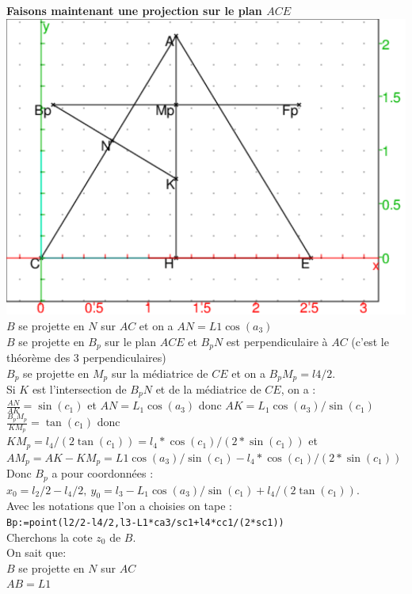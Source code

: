 \documentclass[a4paper,11pt]{book}
\begin{document}
{\bf Faisons maintenant une projection sur le plan  $ACE$}\\
\includegraphics[width=\textwidth]{glucoplan}\\
$B$ se projette en $N$ sur $AC$ et on a $AN=L1\cos(a_3)$\\
$B$ se projette en $B_p$ sur le plan $ACE$ et $B_pN$ est perpendiculaire 
\`a $AC$ (c'est le th\'eor\`eme des 3 perpendiculaires)\\
$B_p$ se projette en $M_p$ sur la m\'ediatrice de $CE$ et on a $B_pM_p=l4/2$.\\
Si $K$ est l'intersection de $B_pN$ et de la m\'ediatrice de $CE$, on a :\\
$\displaystyle \frac{AN}{AK}=\sin(c_1)$ et $AN=L_1\cos(a_3)$ donc
 $AK=L_1\cos(a_3)/\sin(c_1)$\\
$\displaystyle \frac{B_pM_p}{KM_p}=\tan(c_1)$ donc $KM_p=l_4/(2\tan(c_1))=l_4*\cos(c_1)/(2*\sin(c_1))$ et\\
 $AM_p=AK-KM_p=L1\cos(a_3)/\sin(c_1)-l_4*\cos(c_1)/(2*\sin(c_1))$\\
Donc $B_p$ a pour coordonn\'ees :\\
 $x_0=l_2/2-l_4/2,\ y_0= l_3-L_1\cos(a_3)/\sin(c_1)+l_4/(2\tan(c_1))$.\\ 
Avec les notations que l'on a choisies on tape : \\
{\tt Bp:=point(l2/2-l4/2,l3-L1*ca3/sc1+l4*cc1/(2*sc1))}\\
Cherchons la cote $z_0$ de $B$.\\
On sait que:\\ 
$B$ se projette en $N$ sur $AC$\\
$AB=L1$\\
\end{document}
